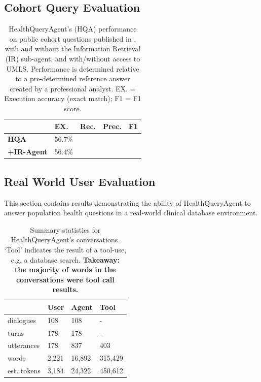 \documentclass[11pt]{article}
\begin{document}
\subsection{Cohort Query Evaluation}
\begin{table}[h]
\begin{tabular}{|l|l|l|l|l|}
\hline
                            &    EX.    & Rec.  & Prec. & F1\\ 
\hline
\textbf{HQA}                &   56.7\% &       &       &   \\
\textbf{+IR-Agent}          &   56.4\% &       &       &   \\
\hline
\end{tabular}
\caption{
    HealthQueryAgent's (HQA) performance on public cohort questions published in \citet{ziletti_generating_2025}, with and without the Information Retrieval (IR) sub-agent, and with/without access to UMLS. Performance is determined relative to a pre-determined reference answer created by a professional analyst. EX. = Execution accuracy (exact match); F1 = F1 score.
}
\end{table}


\subsection{Real World User Evaluation}
This section contains results demonstrating the ability of HealthQueryAgent to answer population health questions in a real-world clinical database environment.

\begin{table}[ht]
\centering
\begin{tabular}{|l|l|l|l|}
\hline
	              & User & Agent & Tool \\
\hline
	dialogues	& 108 & 108    & -   \\
	turns       & 178 & 178    & -   \\
    utterances	& 178 & 837    & 403   \\
	words 		& 2,221 & 16,892 & 315,429 \\
	est. tokens	& 3,184 & 24,322 & 450,612\\
\hline
\end{tabular}
\caption{
Summary statistics for HealthQueryAgent's conversations.
`Tool' indicates the result of a tool-use, e.g. a database search.
\textbf{Takeaway: the majority of words in the conversations were tool call results.}
}
\label{tab:conversation-statistics}
\end{table}
\end{document}

